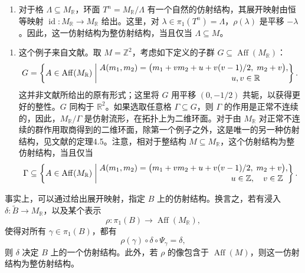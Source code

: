 \begin{example}\label{ex:6.7}
\begin{enumerate}[label=(\arabic*)]
\item 对于格 $\Lambda\subseteq M_{\mathbb R}$，环面 $T^n=M_{\mathbb R}/\Lambda$ 有一个自然的仿射结构，其展开映射由恒等映射 $\operatorname{id}\colon M_{\mathbb R}\to M_{\mathbb R}$ 给出。这里，对 $\lambda\in\pi_1(T^n)=\Lambda$，$\rho(\lambda)$ 是平移 $-\lambda$。因此，这一仿射结构为整仿射结构，当且仅当 $\Lambda\subseteq M$。
\end{enumerate}

\begin{enumerate}[label=(\arabic*),start=2]
\item 这个例子来自文献。取 $M=\mathbb Z^2$，考虑如下定义的子群 $G\subseteq\operatorname{Aff}(M_{\mathbb R})$：
\[
G=\left\{A\in\operatorname{Aff}(M_{\mathbb R})\;\middle|\;
\begin{aligned}
A(m_1,m_2)&=\bigl(m_1+vm_2+u+v(v-1)/2,\;m_2+v\bigr),\\[-2pt]
&\hspace{40mm}u,v\in\mathbb R
\end{aligned}\right\}.
\]
这并非文献所给出的原有形式；这里将 $G$ 用平移 $(0,-1/2)$ 共轭，以获得更好的整性。$G$ 同构于 $\mathbb R^2$。如果选取任意格 $\Gamma\subseteq G$，则 $\Gamma$ 的作用是正常不连续的，因此，$M_{\mathbb R}/\Gamma$ 是仿射流形，在拓扑上为二维环面。对于由 $M_{\mathbb R}$ 对正常不连续的群作用取商得到的二维环面，除第一个例子之外，这是唯一的另一种仿射结构，见文献的定理4.5。注意，相对于整结构 $M\subseteq M_{\mathbb R}$，这个仿射结构为整仿射结构，当且仅当
\[
\Gamma\subseteq\left\{A\in\operatorname{Aff}(M_{\mathbb R})\;\middle|\;
\begin{aligned}
A(m_1,m_2)&=\bigl(m_1+vm_2+u+v(v-1)/2,\;m_2+v\bigr),\\[-2pt]
&\hspace{40mm}u\in\mathbb Z,\quad v\in\mathbb Z
\end{aligned}\right\}.
\]
\end{enumerate}
\end{example}

\begin{note}[numbered]\label{note:6.8}
事实上，可以通过给出展开映射，指定 $B$ 上的仿射结构。换言之，若有浸入 $\delta\colon\widetilde B\to M_{\mathbb R}$，以及某个表示
\[
\rho\colon\pi_1(B)\longrightarrow\operatorname{Aff}(M_{\mathbb R}),
\]
使得对所有 $\gamma\in\pi_1(B)$，都有
\[
\rho(\gamma)\circ\delta\circ\Psi_\gamma=\delta,
\]
则 $\delta$ 决定 $B$ 上的一个仿射结构。此外，若 $\rho$ 的像包含于 $\operatorname{Aff}(M)$，则这一仿射结构为整仿射结构。
\end{note}

